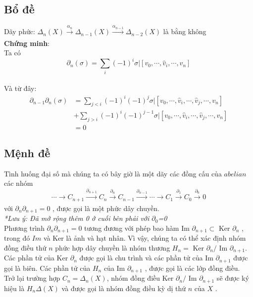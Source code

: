 \subsection[Bổ đề]{Bổ đề}
\indent Dãy phức:   \(\Delta_n(X)\xrightarrow[]{\alpha_n}\Delta_{n-1}(X)\xrightarrow[]{\alpha_{n-1}}\Delta_{n-2}(X)\) là bằng không \\
\textbf{Chứng minh}: \\Ta có \[\partial_n(\sigma) = \sum_{i}(-1)^i\sigma|[v_0, \cdots,\hat{v}_i,\cdots,v_n]\] \\
Và từ đây: 
\begin{equation*}\label{eq:pareto mle2}
\begin{aligned}
\partial_{n-1}\partial_n(\sigma) & = \sum_{j<i}(-1)^i(-1)^j\sigma|[v_0, \cdots,\hat{v}_i,\cdots,\hat{v}_j,\cdots,v_n]\\ & + \sum_{j>i}(-1)^i(-1)^{j-1}\sigma|[v_0, \cdots,\hat{v}_i,\cdots,\hat{v}_j,\cdots,v_n] \\
& = 0
\end{aligned}
\end{equation*}
\subsection[Mệnh đề]{Mệnh đề}
\indent Tình huống đại số mà chúng ta có bây giờ là một dãy các đồng cấu của \(abelian\) các nhóm 
\[\cdots\rightarrow C_{n+1} \xrightarrow[]{\partial_{n+1}} C_{n} \xrightarrow[]{\partial_{n}} C_{n-1} \xrightarrow[]{\partial_{n-1}} \cdots \rightarrow C_1 \xrightarrow[]{\partial_{1}} C_0 \xrightarrow[]{\partial_{0}} 0 \]
với \(\partial_n\partial_{n+1} = 0\) , được gọi là một phức dây chuyền. \\
\indent \emph{*Lưu ý: Đã mở rộng thêm 0 ở cuối bên phải với \(\partial_0\)=0} \\
\indent Phương trình \(\partial_n\partial_{n+1} = 0\) tương đương với phép bao hàm Im \(\partial_{n+1} \subset\) Ker \(\partial_n\) , trong đó \(Im\) và Ker là ảnh và hạt nhân. Vì vậy, chúng ta có thể xác định nhóm đồng điều thứ \(n\) phức hợp dây chuyền là nhóm thương \(H_n =\) Ker \(\partial_n / \) Im \(\partial_{n+1}\). Các phần tử của Ker \(\partial_n\) được gọi là chu trình và các phần tử của Im \(\partial_{n+1}\) được gọi là biên. Các phần tử của \(H_n\) của Im \(\partial_{n+1}\) , được gọi là các lớp đồng điều. \\
\indent Trở lại trường hợp \(C_n = \Delta_n(X)\), nhóm đồng điều Ker \(\partial_n/\) Im \(\partial_{n+1}\) sẽ được ký hiệu là \(H_n\Delta(X)\) và được gọi là nhóm đồng điều kỳ dị thứ \(n\) của \(X\) . 
